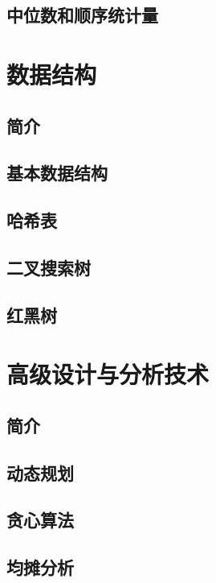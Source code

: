 \documentclass[lang=cn,newtx,10pt,scheme=chinese]{elegantbook}
\begin{document}
\chapter{中位数和顺序统计量}

\part{数据结构}

\chapter*{简介}

\chapter{基本数据结构}

\chapter{哈希表}

\chapter{二叉搜索树}

\chapter{红黑树}

\part{高级设计与分析技术}

\chapter*{简介}

\chapter{动态规划}

\chapter{贪心算法}

\chapter{均摊分析}
\end{document}
